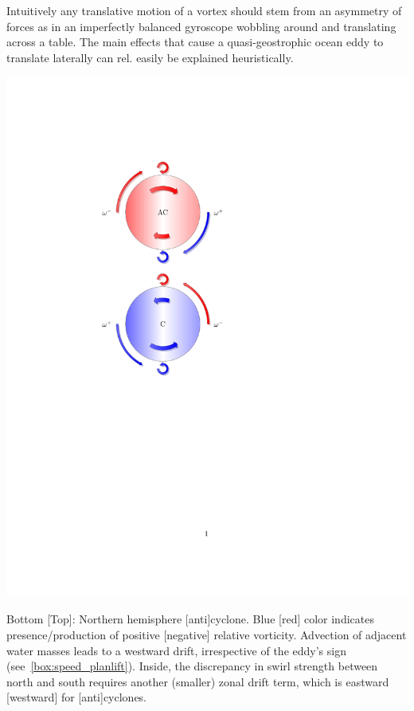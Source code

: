 Intuitively any translative motion of a vortex should stem from an asymmetry of forces as in an imperfectly balanced gyroscope wobbling around and translating across a table.
The main effects that cause a quasi-geostrophic ocean eddy to translate laterally can rel. easily be explained heuristically.

\begin{marginfigure}
\includegraphics[width=1\textwidth]{eddyTikz}
\caption{Bottom [Top]: Northern hemisphere [anti]cyclone. Blue [red] color indicates presence/production of positive [negative] relative vorticity. Advection of adjacent water masses leads to a westward drift, irrespective of the eddy's sign (see~\cref{box:speed_planlift}). Inside, the discrepancy in swirl strength between north and south requires another (smaller) zonal drift term, which is eastward [westward] for [anti]cyclones. }
\label{fig:eddyTikz}
\end{marginfigure}

